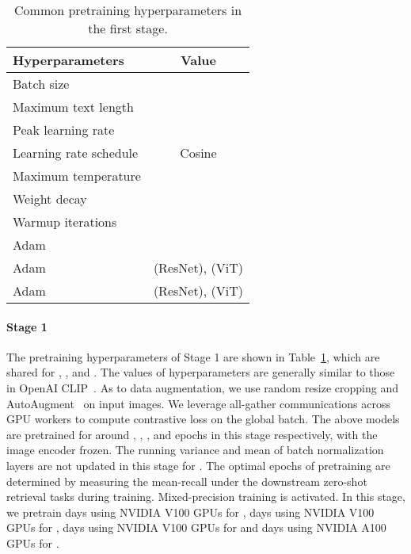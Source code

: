\documentclass[11pt]{article}
\begin{document}
\begin{table}[t]
\center
\small
\begin{tabular}{lc}
\toprule
  Hyperparameters
  & Value
  \\
\midrule
    Batch size
    & 
    \\
    Maximum text length
    & 
    \\             
    Peak learning rate
    & 
    \\
    Learning rate schedule
    & Cosine
    \\    
Maximum temperature
    & 
    \\
    Weight decay
    & 
    \\        
    Warmup iterations
    & 
    \\        
    Adam 
    & 
    \\      
    Adam 
    &  (ResNet),  (ViT)
    \\     
    Adam 
    &  (ResNet),  (ViT)
    \\        
\bottomrule
\end{tabular}
\caption{Common pretraining hyperparameters in the first stage.}
\label{tb:hyperparams_stage1}
\end{table} 
\paragraph{Stage 1} 
The pretraining hyperparameters of Stage 1 are shown in Table~\ref{tb:hyperparams_stage1}, which are shared for , ,  and . 
The values of hyperparameters are generally similar to those in OpenAI CLIP~\citep{clip}. 
As to data augmentation, we use random resize cropping and AutoAugment~\citep{autoaugment} on input images. We leverage all-gather communications across GPU workers to compute contrastive loss on the global batch. The above  models are pretrained for around , , , and  epochs in this stage respectively, with the image encoder frozen. The running variance and mean of batch normalization layers are not updated in this stage for . The optimal epochs of pretraining are determined by measuring the mean-recall under the  downstream zero-shot retrieval tasks during training. Mixed-precision training is activated. 
In this stage, we pretrain  days using  NVIDIA V100 GPUs for ,  days using  NVIDIA V100 GPUs for ,  days using  NVIDIA V100 GPUs for  and  days using  NVIDIA A100 GPUs for .
\end{document}
